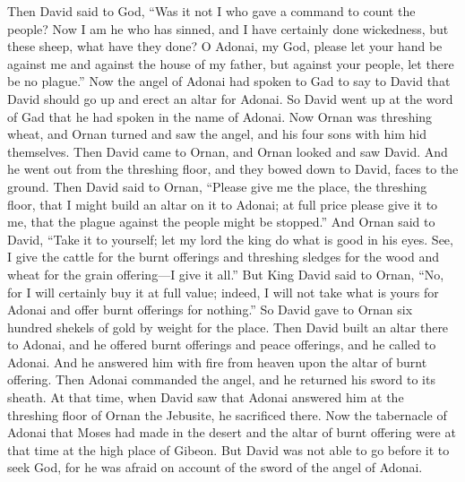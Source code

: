 \begin{biblechapter}
\verse Then David said to God, “Was it not I who gave a command to count the people? Now I am he who has sinned, and I have certainly done wickedness, but these sheep, what have they done? O Adonai, my God, please let your hand be against me and against the house of my father, but against your people, let there be no plague.”
 Now the angel of Adonai had spoken to Gad to say to David that David should go up and erect an altar for Adonai.
\verse So David went up at the word of Gad that he had spoken in the name of Adonai.
\verse Now Ornan was threshing wheat, and Ornan turned and saw the angel, and his four sons with him hid themselves.
\verse Then David came to Ornan, and Ornan looked and saw David. And he went out from the threshing floor, and they bowed down to David, faces to the ground.
\verse Then David said to Ornan, “Please give me the place, the threshing floor, that I might build an altar on it to Adonai; at full price please give it to me, that the plague against the people might be stopped.”
\verse And Ornan said to David, “Take it to yourself; let my lord the king do what is good in his eyes. See, I give the cattle for the burnt offerings and threshing sledges for the wood and wheat for the grain offering—I give it all.”
\verse But King David said to Ornan, “No, for I will certainly buy it at full value; indeed, I will not take what is yours for Adonai and offer burnt offerings for nothing.”
\verse So David gave to Ornan six hundred shekels of gold by weight for the place.
\verse Then David built an altar there to Adonai, and he offered burnt offerings and peace offerings, and he called to Adonai. And he answered him with fire from heaven upon the altar of burnt offering.
\verse Then Adonai commanded the angel, and he returned his sword to its sheath.
\verse At that time, when David saw that Adonai answered him at the threshing floor of Ornan the Jebusite, he sacrificed there.
\verse Now the tabernacle of Adonai that Moses had made in the desert and the altar of burnt offering were at that time at the high place of Gibeon.
\verse But David was not able to go before it to seek God, for he was afraid on account of the sword of the angel of Adonai.
\end{biblechapter}

